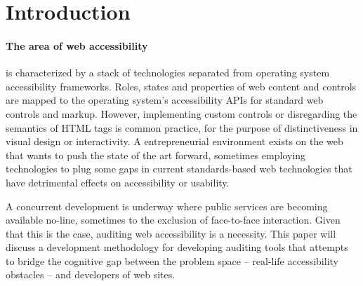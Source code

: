 \section{Introduction} %
\label{sec:introduction}

\paragraph{The area of web accessibility} %
 \label{par:the_area_of_web_accessibility}
 is characterized by a stack of technologies separated from operating system accessibility frameworks. Roles, states and properties of web content and controls are mapped to the operating system's accessibility APIs for standard web controls and markup. 
 However, implementing custom controls or disregarding the semantics of HTML tags is common practice, for the purpose of distinctiveness in visual design or interactivity. A entrepreneurial environment exists on the web that wants to push the state of the art forward, sometimes employing technologies to plug some gaps in current standards-based web technologies that have detrimental effects on accessibility or usability.

A concurrent development is underway where public services are becoming available no-line, sometimes to the exclusion of face-to-face interaction. 
Given that this is the case, auditing web accessibility is a necessity. 
This paper will discuss a development methodology for developing auditing tools that attempts to bridge the cognitive gap between the problem space -- real-life accessibility obstacles -- and developers of web sites.

